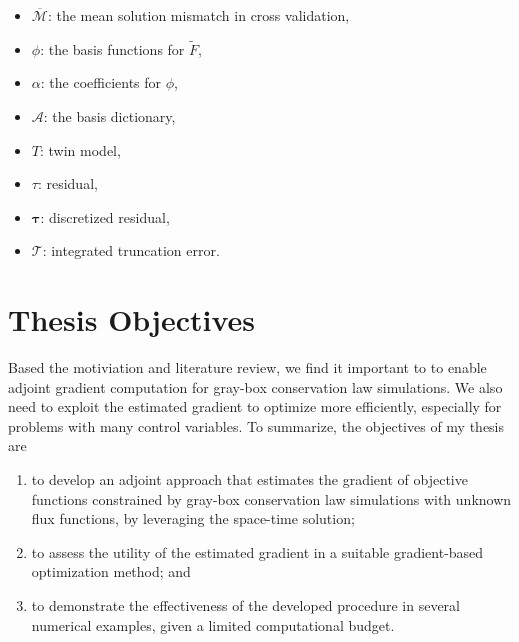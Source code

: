 \begin{itemize}
    \item $\overline{\mathcal{M}}$: the mean solution mismatch in cross validation,
    \item $\phi$: the basis functions for $\tilde{F}$,
    \item $\alpha$: the coefficients for $\phi$,
    \item $\mathcal{A}$: the basis dictionary,
    \item $T$: twin model,
    \item $\tau$: residual,
    \item $\boldsymbol{\tau}$: discretized residual,
    \item $\mathcal{T}$: integrated truncation error.
\end{itemize}



\section{Thesis Objectives}
Based the motiviation and literature review, we find it important to to enable adjoint
gradient computation for gray-box conservation law simulations. We also need to 
exploit the estimated gradient to optimize more efficiently, 
especially for problems with many control variables. 
To summarize, the objectives of my thesis are
\begin{enumerate}
    \item to develop an adjoint approach that estimates the gradient of objective functions
          constrained by gray-box conservation law simulations with unknown flux functions,
          by leveraging the space-time solution;
    \item to assess the utility of the estimated gradient in a suitable 
          gradient-based optimization method; and
    \item to demonstrate the effectiveness of the developed procedure in several numerical examples,
          given a limited computational budget.
\end{enumerate}


